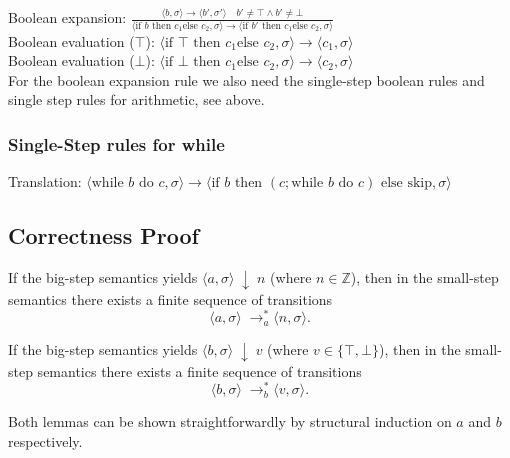 Boolean expansion: $\frac{\langle b, \sigma \rangle \rightarrow \langle b', \sigma' \rangle \quad b' \not = \top \land b' \not = \bot}{
\langle \text{if } b \text{ then } c_1 \text{else } c_2, \sigma \rangle \rightarrow \langle \text{if } b' \text{ then } c_1 \text{else } c_2, \sigma \rangle 
}$ \\
Boolean evaluation ($\top$): $\langle \text{if } \top \text{ then } c_1 \text{else } c_2, \sigma \rangle \rightarrow \langle c_1 , \sigma \rangle 
$ \\
Boolean evaluation ($\bot$): $
\langle \text{if } \bot \text{ then } c_1 \text{else } c_2, \sigma \rangle \rightarrow \langle c_2 , \sigma \rangle 
$ \\
For the boolean expansion rule we also need the single-step boolean rules and single step rules for arithmetic, see above. 



\subsubsection{Single-Step rules for while}
Translation: $\langle \text{while } b \text{ do } c, \sigma \rangle \rightarrow \langle \text{if } b \text{ then } (c;\text{while } b \text{ do } c) \text{ else skip}, \sigma \rangle $ \\

\subsection{Correctness Proof}

\begin{lemma}
If the big-step semantics yields \(\langle a, \sigma \rangle \;\downarrow\; n\) (where \(n \in \mathbb{Z}\)),  
then in the small-step semantics there exists a finite sequence of transitions  
\[
\langle a, \sigma \rangle \;\to_a^{*} \langle n, \sigma \rangle.
\]
\end{lemma}

\begin{lemma}
If the big-step semantics yields \(\langle b, \sigma \rangle \;\downarrow\; v\) (where \(v \in \{\top, \bot\}\)),  
then in the small-step semantics there exists a finite sequence of transitions  
\[
\langle b, \sigma \rangle \;\to_b^{*} \langle v, \sigma \rangle.
\]
\end{lemma} 

Both lemmas can be shown straightforwardly by structural induction on $a$ and $b$ respectively. %


